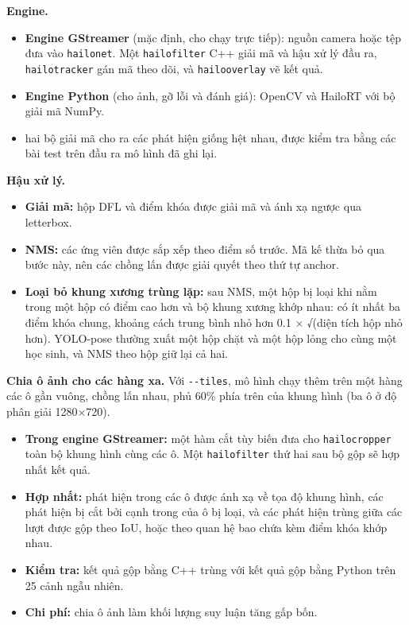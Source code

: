 \textbf{Engine.}

\begin{itemize}
\tightlist
\item
  \textbf{Engine GStreamer} (mặc định, cho chạy trực tiếp): nguồn camera hoặc tệp đưa vào \texttt{hailonet}. Một \texttt{hailofilter} C++ giải mã và hậu xử lý đầu ra, \texttt{hailotracker} gán mã theo dõi, và \texttt{hailooverlay} vẽ kết quả.
\item
  \textbf{Engine Python} (cho ảnh, gỡ lỗi và đánh giá): OpenCV và HailoRT với bộ giải mã NumPy.
\item hai bộ giải mã cho ra các phát hiện giống hệt nhau, được kiểm tra bằng các bài test trên đầu ra mô hình đã ghi lại.
\end{itemize}

\textbf{Hậu xử lý.}

\begin{itemize}
\tightlist
\item
  \textbf{Giải mã:} hộp DFL và điểm khóa được giải mã và ánh xạ ngược qua letterbox.
\item
  \textbf{NMS:} các ứng viên được sắp xếp theo điểm số trước. Mã kế thừa bỏ qua bước này, nên các chồng lấn được giải quyết theo thứ tự anchor.
\item
  \textbf{Loại bỏ khung xương trùng lặp:} sau NMS, một hộp bị loại khi nằm trong một hộp có điểm cao hơn và bộ khung xương khớp nhau: có ít nhất ba điểm khóa chung, khoảng cách trung bình nhỏ hơn 0.1 × √(diện tích hộp nhỏ hơn). YOLO-pose thường xuất một hộp chặt và một hộp lỏng cho cùng một học sinh, và NMS theo hộp giữ lại cả hai.
\end{itemize}

\textbf{Chia ô ảnh cho các hàng xa.} Với \texttt{-\/-tiles}, mô hình chạy thêm trên một hàng các ô gần vuông, chồng lấn nhau, phủ 60\% phía trên của khung hình (ba ô ở độ phân giải 1280×720).

\begin{itemize}
\tightlist
\item
  \textbf{Trong engine GStreamer:} một hàm cắt tùy biến đưa cho \texttt{hailocropper} toàn bộ khung hình cùng các ô. Một \texttt{hailofilter} thứ hai sau bộ gộp sẽ hợp nhất kết quả.
\item
  \textbf{Hợp nhất:} phát hiện trong các ô được ánh xạ về tọa độ khung hình, các phát hiện bị cắt bởi cạnh trong của ô bị loại, và các phát hiện trùng giữa các lượt được gộp theo IoU, hoặc theo quan hệ bao chứa kèm điểm khóa khớp nhau.
\item
  \textbf{Kiểm tra:} kết quả gộp bằng C++ trùng với kết quả gộp bằng Python trên 25 cảnh ngẫu nhiên.
\item
  \textbf{Chi phí:} chia ô ảnh làm khối lượng suy luận tăng gấp bốn.
\end{itemize}

